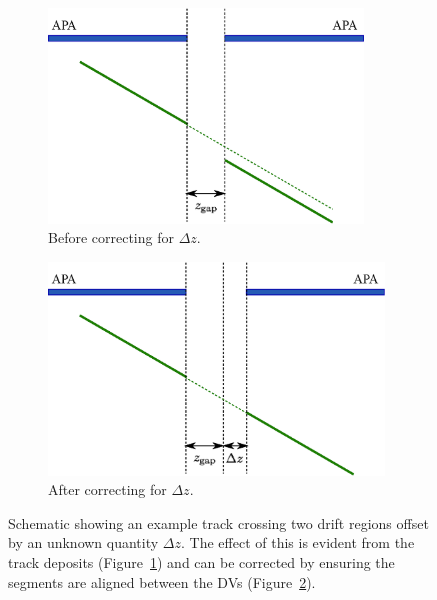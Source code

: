 \begin{figure}
  \centering
  \begin{subfigure}[t]{0.48\linewidth}
    \centering
    \includegraphics[width=0.92\textwidth]{apa_gap_zoffset.eps}
    \caption{Before correcting for $\Delta z$.}
    \label{fig:APAGapZOffsetUncorrected}
  \end{subfigure}
  \hfill
  \begin{subfigure}[t]{0.48\linewidth}
    \centering
    \includegraphics[width=0.98\textwidth]{apa_gap_zoffset_fix.eps}
    \caption{After correcting for $\Delta z$.}
    \label{fig:APAGapZOffsetCorrected}
  \end{subfigure}
  \caption[Schematic showing an example track crossing two drift regions offset by an unknown quantity $\Delta z$.]{Schematic showing an example track crossing two drift regions offset by an unknown quantity $\Delta z$.  The effect of this is evident from the track deposits (Figure~\ref{fig:APAGapZOffsetUncorrected}) and can be corrected by ensuring the segments are aligned between the DVs (Figure~\ref{fig:APAGapZOffsetCorrected}).}
  \label{fig:APAGapZOffset}
\end{figure}

